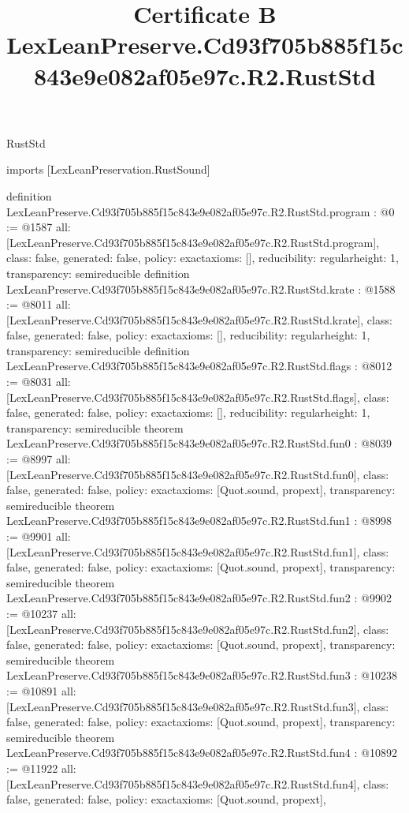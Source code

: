 \begin{lexlean}{RustStd}
\title{Certificate B LexLeanPreserve.Cd93f705b885f15c843e9e082af05e97c.R2.RustStd}
\begin{coremodule}
imports [LexLeanPreservation.RustSound]

definition LexLeanPreserve.Cd93f705b885f15c843e9e082af05e97c.R2.RustStd.program : @0 := @1587 {
  all: [LexLeanPreserve.Cd93f705b885f15c843e9e082af05e97c.R2.RustStd.program],
  class: false,
  generated: false,
  policy: exact{axioms: []},
  reducibility: regular{height: 1},
  transparency: semireducible
}
definition LexLeanPreserve.Cd93f705b885f15c843e9e082af05e97c.R2.RustStd.krate : @1588 := @8011 {
  all: [LexLeanPreserve.Cd93f705b885f15c843e9e082af05e97c.R2.RustStd.krate],
  class: false,
  generated: false,
  policy: exact{axioms: []},
  reducibility: regular{height: 1},
  transparency: semireducible
}
definition LexLeanPreserve.Cd93f705b885f15c843e9e082af05e97c.R2.RustStd.flags : @8012 := @8031 {
  all: [LexLeanPreserve.Cd93f705b885f15c843e9e082af05e97c.R2.RustStd.flags],
  class: false,
  generated: false,
  policy: exact{axioms: []},
  reducibility: regular{height: 1},
  transparency: semireducible
}
theorem LexLeanPreserve.Cd93f705b885f15c843e9e082af05e97c.R2.RustStd.fun0 : @8039 := @8997 {
  all: [LexLeanPreserve.Cd93f705b885f15c843e9e082af05e97c.R2.RustStd.fun0],
  class: false,
  generated: false,
  policy: exact{axioms: [Quot.sound, propext]},
  transparency: semireducible
}
theorem LexLeanPreserve.Cd93f705b885f15c843e9e082af05e97c.R2.RustStd.fun1 : @8998 := @9901 {
  all: [LexLeanPreserve.Cd93f705b885f15c843e9e082af05e97c.R2.RustStd.fun1],
  class: false,
  generated: false,
  policy: exact{axioms: [Quot.sound, propext]},
  transparency: semireducible
}
theorem LexLeanPreserve.Cd93f705b885f15c843e9e082af05e97c.R2.RustStd.fun2 : @9902 := @10237 {
  all: [LexLeanPreserve.Cd93f705b885f15c843e9e082af05e97c.R2.RustStd.fun2],
  class: false,
  generated: false,
  policy: exact{axioms: [Quot.sound, propext]},
  transparency: semireducible
}
theorem LexLeanPreserve.Cd93f705b885f15c843e9e082af05e97c.R2.RustStd.fun3 : @10238 := @10891 {
  all: [LexLeanPreserve.Cd93f705b885f15c843e9e082af05e97c.R2.RustStd.fun3],
  class: false,
  generated: false,
  policy: exact{axioms: [Quot.sound, propext]},
  transparency: semireducible
}
theorem LexLeanPreserve.Cd93f705b885f15c843e9e082af05e97c.R2.RustStd.fun4 : @10892 := @11922 {
  all: [LexLeanPreserve.Cd93f705b885f15c843e9e082af05e97c.R2.RustStd.fun4],
  class: false,
  generated: false,
  policy: exact{axioms: [Quot.sound, propext]},
}
\end{coremodule}
\end{lexlean}
